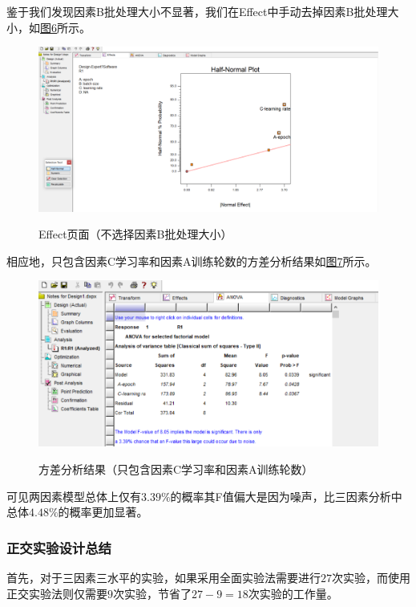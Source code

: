 \documentclass[UTF8]{ctexart}
\begin{document}
	鉴于我们发现因素B批处理大小不显著，我们在Effect中手动去掉因素B批处理大小，如\hyperref[Fig.6]{图6}所示。
	
	\begin{figure}[htbp]
		\centering
		\caption{Effect页面（不选择因素B批处理大小）}
		\includegraphics[width=1.0\textwidth]{pic9.png}
		\label{Fig.6}
	\end{figure}

	相应地，只包含因素C学习率和因素A训练轮数的方差分析结果如\hyperref[Fig.7]{图7}所示。
		
	\begin{figure}[htbp]
		\centering
		\caption{方差分析结果（只包含因素C学习率和因素A训练轮数）}
		\includegraphics[width=1.0\textwidth]{pic10.png}
		\label{Fig.7}
	\end{figure}
	
	可见两因素模型总体上仅有$3.39\%$的概率其F值偏大是因为噪声，比三因素分析中总体$4.48\%$的概率更加显著。
	
	\subsubsection{正交实验设计总结}
	
	首先，对于三因素三水平的实验，如果采用全面实验法需要进行$27$次实验，而使用正交实验法则仅需要$9$次实验，节省了$27-9=18$次实验的工作量。
	
\end{document}

